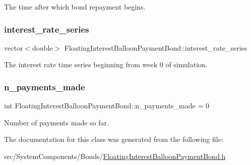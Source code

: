 The time after which bond repayment begins. 

\mbox{\label{classFloatingInterestBalloonPaymentBond_a36c73466753c976e513c6763f79f58ad}} 
\subsubsection{\texorpdfstring{interest\+\_\+rate\+\_\+series}{interest\_rate\_series}}
{\footnotesize\ttfamily vector$<$double$>$ Floating\+Interest\+Balloon\+Payment\+Bond\+::interest\+\_\+rate\+\_\+series\hspace{0.3cm}{\ttfamily [private]}}



The interest rate time series beginning from week 0 of simulation. 

\mbox{\label{classFloatingInterestBalloonPaymentBond_afc1a77eb5d799201c7ef5c52ef5df374}} 
\subsubsection{\texorpdfstring{n\+\_\+payments\+\_\+made}{n\_payments\_made}}
{\footnotesize\ttfamily int Floating\+Interest\+Balloon\+Payment\+Bond\+::n\+\_\+payments\+\_\+made = 0\hspace{0.3cm}{\ttfamily [private]}}



Number of payments made so far. 



The documentation for this class was generated from the following file\+:\begin{DoxyCompactItemize}
\item 
src/\+System\+Components/\+Bonds/\mbox{\hyperlink{FloatingInterestBalloonPaymentBond_8h}{Floating\+Interest\+Balloon\+Payment\+Bond.\+h}}\end{DoxyCompactItemize}
